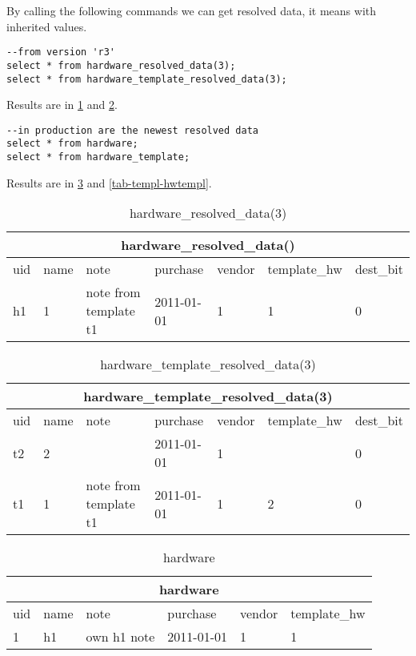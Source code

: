 \documentclass[deska]{subfiles}
\begin{document}
By calling the following commands we can get resolved data, it means with inherited values.
\begin{verbatim}
--from version 'r3'
select * from hardware_resolved_data(3);
select * from hardware_template_resolved_data(3);
\end{verbatim}

Results are in \ref{tab-templ-hwres2} and \ref{tab-templ-hwtemplres2}.

\begin{verbatim}
--in production are the newest resolved data
select * from hardware;
select * from hardware_template;
\end{verbatim}
Results are in \ref{tab-templ-hw} and \ref{tab-templ-hwtempl}.

\begin{center}

\begin{table}
    \caption{hardware\_resolved\_data(3)}
    \label{tab-templ-hwres2}
\begin{tabular}{ | l | l | l | l | l | l | l |}
    \hline
    \multicolumn{7}{|c|}{hardware\_resolved\_data()}\\
    \hline
    uid & name & note & purchase & vendor & template\_hw & dest\_bit\\
    \hline
    h1 & 1 & note from template t1 & 2011-01-01 & 1 & 1 & 0\\
    \hline
\end{tabular}
\end{table}

\begin{table}
    \caption{hardware\_template\_resolved\_data(3)}
    \label{tab-templ-hwtemplres2}
\begin{tabular}{ | l | l | l | l | l | l | l |}
    \hline
    \multicolumn{7}{|c|}{hardware\_template\_resolved\_data(3)}\\
    \hline
    uid & name & note & purchase & vendor & template\_hw & dest\_bit\\
    \hline
    t2 & 2 &  & 2011-01-01 & 1 &  & 0\\
    t1 & 1 & note from template t1 & 2011-01-01 & 1 & 2 & 0\\
    \hline
\end{tabular}
\end{table}

\begin{table}
    \caption{hardware}
    \label{tab-templ-hw}
\begin{tabular}{ | l | l | l | l | l | l |}
    \hline
    \multicolumn{6}{|c|}{hardware}\\
    \hline
    uid & name & note & purchase & vendor & template\_hw\\
    \hline
    1 & h1 & own h1 note & 2011-01-01 & 1 & 1\\
    \hline
\end{tabular}
\end{table}


\end{center}
\end{document}
